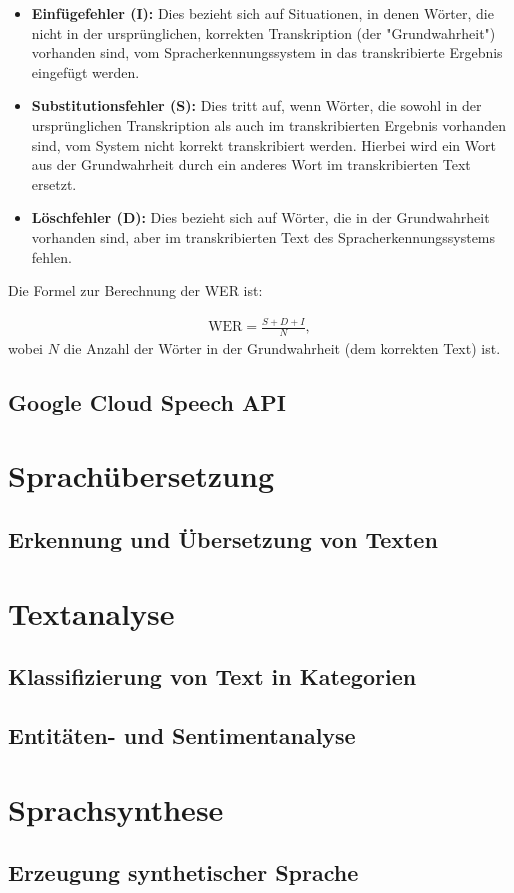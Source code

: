 \documentclass[12pt,a4paper]{article}
\begin{document}
\begin{itemize}
	\item \textbf{Einfügefehler (I):} Dies bezieht sich auf Situationen, in denen Wörter, die nicht in der ursprünglichen, korrekten Transkription (der "Grundwahrheit") vorhanden sind, vom Spracherkennungssystem in das transkribierte Ergebnis eingefügt werden.
	\item \textbf{Substitutionsfehler (S):} Dies tritt auf, wenn Wörter, die sowohl in der ursprünglichen Transkription als auch im transkribierten Ergebnis vorhanden sind, vom System nicht korrekt transkribiert werden. Hierbei wird ein Wort aus der Grundwahrheit durch ein anderes Wort im transkribierten Text ersetzt.
	\item \textbf{Löschfehler (D):} Dies bezieht sich auf Wörter, die in der Grundwahrheit vorhanden sind, aber im transkribierten Text des Spracherkennungssystems fehlen.
\end{itemize}

Die Formel zur Berechnung der WER ist:

\begin{align}
\text{WER} = \frac{S + D + I}{N},
\end{align}
wobei \(N\) die Anzahl der Wörter in der Grundwahrheit (dem korrekten Text) ist.



\subsection{Google Cloud Speech API}


\newpage

\section{Sprachübersetzung}
\subsection{Erkennung und Übersetzung von Texten}

\newpage

\section{Textanalyse}
\subsection{Klassifizierung von Text in Kategorien}
\subsection{Entitäten- und Sentimentanalyse}

\newpage

\section{Sprachsynthese}
\subsection{Erzeugung synthetischer Sprache}

\newpage
	
\end{document}
